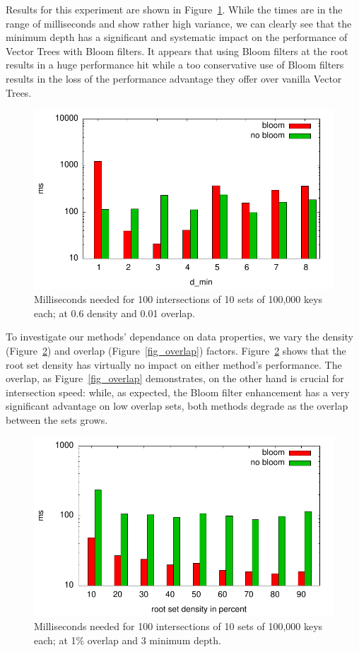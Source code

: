 \documentclass[11pt,letterpaper]{article}
\begin{document}
Results for this experiment are shown in
Figure~\ref{fig_min_depth}. While the times are in the range of
milliseconds and show rather high variance, we can clearly see that
the minimum depth has a significant and systematic impact on the
performance of Vector Trees with Bloom filters. It appears that using
Bloom filters at the root results in a huge performance hit while a
too conservative use of Bloom filters results in the loss of the
performance advantage they offer over vanilla Vector Trees.

\begin{figure}[t]
\center
\includegraphics[width=0.98\linewidth]{../data/min_depth.pdf}
\caption{Milliseconds needed for 100 intersections of 10 sets of
  100,000 keys each; at 0.6 density and 0.01 overlap.}
\label{fig_min_depth}
\end{figure}

To investigate our methods' dependance on data properties, we vary the
density (Figure~\ref{fig_density}) and overlap
(Figure~\ref{fig_overlap}) factors. Figure~\ref{fig_density} shows
that the root set density has virtually no impact on either method's
performance. The overlap, as Figure~\ref{fig_overlap} demonstrates, on
the other hand is crucial for intersection speed: while, as expected,
the Bloom filter enhancement has a very significant advantage on low
overlap sets, both methods degrade as the overlap between the sets
grows.

\begin{figure}[t]
\center
\includegraphics[width=0.98\linewidth]{../data/density.pdf}
\caption{Milliseconds needed for 100 intersections of 10 sets of
  100,000 keys each; at 1\% overlap and 3 minimum depth.}
\label{fig_density}
\end{figure}
\end{document}
